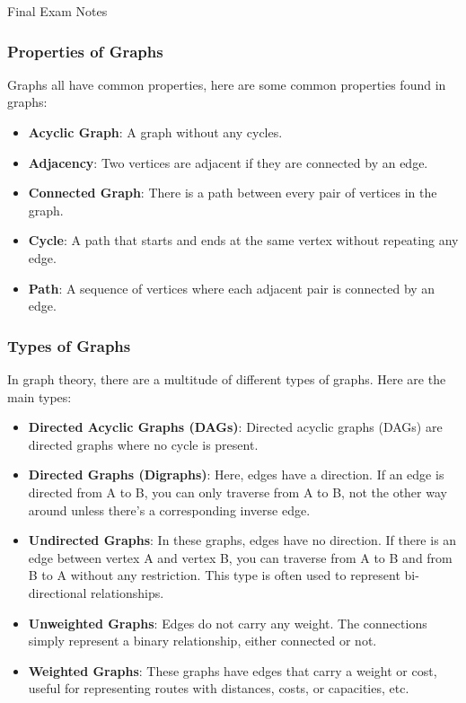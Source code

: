 \begin{examnotes}{Final Exam Notes}
    \subsubsection*{Properties of Graphs}

    Graphs all have common properties, here are some common properties found in graphs:

    \begin{itemize}
        \item \textbf{Acyclic Graph}: A graph without any cycles.
        \item \textbf{Adjacency}: Two vertices are adjacent if they are connected by an edge.
        \item \textbf{Connected Graph}: There is a path between every pair of vertices in the graph.
        \item \textbf{Cycle}: A path that starts and ends at the same vertex without repeating any edge.
        \item \textbf{Path}: A sequence of vertices where each adjacent pair is connected by an edge.
    \end{itemize}

    \subsubsection*{Types of Graphs}

    In graph theory, there are a multitude of different types of graphs. Here are the main types:

    \begin{itemize}
        \item \textbf{Directed Acyclic Graphs (DAGs)}: Directed acyclic graphs (DAGs) are directed graphs where no cycle is present.
        \item \textbf{Directed Graphs (Digraphs)}: Here, edges have a direction. If an edge is directed from A to B, you can only traverse from A to B, not the other way around unless there's a corresponding inverse edge.
        \item \textbf{Undirected Graphs}: In these graphs, edges have no direction. If there is an edge between vertex A and vertex B, you can traverse from A to B and from B to A without any restriction. 
        This type is often used to represent bi-directional relationships.
        \item \textbf{Unweighted Graphs}: Edges do not carry any weight. The connections simply represent a binary relationship, either connected or not.
        \item \textbf{Weighted Graphs}: These graphs have edges that carry a weight or cost, useful for representing routes with distances, costs, or capacities, etc.
    \end{itemize}


\end{examnotes}
